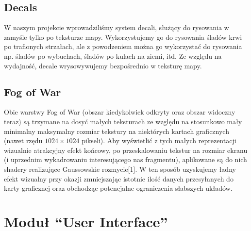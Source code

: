 \documentclass[licencjacka]{pracamgr}
\begin{document}
    \subsection{Decals}
      W naszym projekcie wprowadziliśmy system decali, służący do rysowania w zamyśle tylko po teksturze mapy.
      Wykorzystujemy go do rysowania śladów krwi po trafionych strzałach, ale z powodzeniem można go wykorzystać do
      rysowania np. śladów po wybuchach, śladów po kulach na ziemi, itd. Ze względu na wydajność, decale wrysowywujemy
      bezpośrednio w teksturę mapy.

    \subsection{Fog of War}
      Obie warstwy Fog of War (obszar kiedykolwiek odkryty oraz obszar widoczny teraz) są trzymane na dosyć małych
      teksturach ze względu na stosunkowo mały minimalny maksymalny rozmiar tekstury na niektórych kartach graficznych
      (nawet rzędu $1024 \times 1024$ pikseli). Aby wyświetlić z tych małych reprezentacji wizualnie atrakcyjny efekt
      końcowy, po przeskalowaniu tekstur na rozmiar ekranu (i uprzednim wykadrowaniu interesującego nas fragmentu),
      aplikowane są do nich shadery realizujące Gaussowskie rozmycie[1]. W ten sposób uzyskujemy ładny efekt wizualny
      przy okazji zmniejszając istotnie ilość danych przesyłanych do karty graficznej oraz obchodząc potencjalne
      ograniczenia słabszych układów.

  \section{Moduł ``User Interface''}



\end{document}

